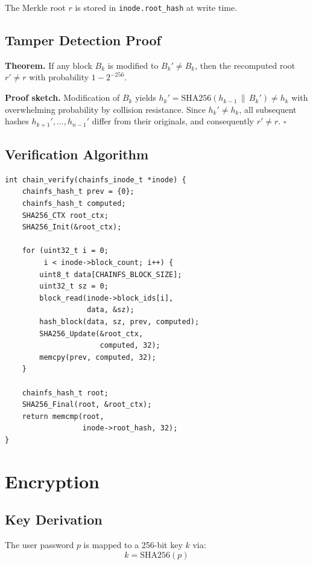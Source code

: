 \documentclass[10pt,twocolumn]{article}
\begin{document}
The Merkle root $r$ is stored in
\texttt{inode.root\_hash} at write time.

\subsection{Tamper Detection Proof}

\textbf{Theorem.}
If any block $B_k$ is modified to
$B_k' \neq B_k$, then the recomputed
root $r' \neq r$ with probability
$1 - 2^{-256}$.

\textbf{Proof sketch.}
Modification of $B_k$ yields
$h_k' = \text{SHA256}(h_{k-1} \,\|\, B_k')
\neq h_k$
with overwhelming probability by
collision resistance.
Since $h_k' \neq h_k$, all subsequent
hashes $h_{k+1}', \ldots, h_{n-1}'$
differ from their originals,
and consequently $r' \neq r$. $\square$

\subsection{Verification Algorithm}

\begin{lstlisting}[caption={Verification procedure}]
int chain_verify(chainfs_inode_t *inode) {
    chainfs_hash_t prev = {0};
    chainfs_hash_t computed;
    SHA256_CTX root_ctx;
    SHA256_Init(&root_ctx);

    for (uint32_t i = 0;
         i < inode->block_count; i++) {
        uint8_t data[CHAINFS_BLOCK_SIZE];
        uint32_t sz = 0;
        block_read(inode->block_ids[i],
                   data, &sz);
        hash_block(data, sz, prev, computed);
        SHA256_Update(&root_ctx,
                      computed, 32);
        memcpy(prev, computed, 32);
    }

    chainfs_hash_t root;
    SHA256_Final(root, &root_ctx);
    return memcmp(root,
                  inode->root_hash, 32);
}
\end{lstlisting}

\section{Encryption}

\subsection{Key Derivation}

The user password $p$ is mapped to a
256-bit key $k$ via:
\[
k = \text{SHA256}(p)
\]
\end{document}
